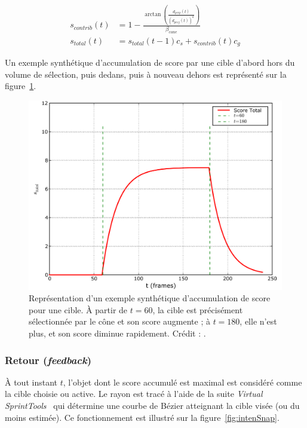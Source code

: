 	\begin{align}
		\label{eq:intensContrib}
		s_{contrib}(t) &= 1 - \frac{\arctan \left(\frac{d_{perp}(t)}{\left(d_{proj}(t)\right)^{k}}\right)}{\beta_{cone}} \\
		\label{eq:intensTotal}
		s_{total}(t) &= s_{total}(t-1)c_{s} + s_{contrib}(t)c_{g}
	\end{align}
	
	Un exemple synthétique d'accumulation de score par une cible d'abord hors du volume de sélection, puis dedans, puis à nouveau dehors est représenté sur la figure~\ref{fig:intensAccumul}.
	
	\begin{figure}[H]
		\centering
		\includegraphics[width=\textwidth]{figures/ch2/intensAccumul}
		\caption[\emph{IntenSelect} --- Accumulation de score]{Représentation d'un exemple synthétique d'accumulation de score pour une cible. À partir de $t = 60$, la cible est précisément sélectionnée par le cône et son score augmente ; à $t = 180$, elle n'est plus, et son score diminue rapidement. Crédit : \cite{de2005intenselect}.}
		\label{fig:intensAccumul}
	\end{figure}
	
	\subsubsection{Retour (\emph{feedback})}
	À tout instant $t$, l'objet dont le score accumulé est maximal est considéré comme la cible choisie ou active. Le rayon est tracé à l'aide de la suite \emph{Virtual SprintTools}~\cite{koutek2001spring} qui détermine une courbe de Bézier atteignant la cible visée (ou du moins estimée). Ce fonctionnement est illustré sur la figure~\ref{fig:intenSnap}.
	
